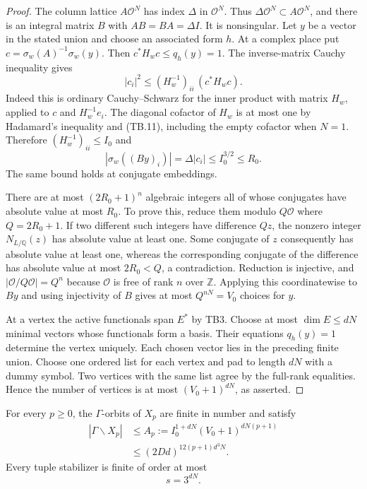 \begin{proof}
The column lattice $A\mathcal O^N$ has index $\Delta$ in
$\mathcal O^N$.  Thus $\Delta\mathcal O^N\subset A\mathcal O^N$,
and there is an integral matrix $B$ with
$AB=BA=\Delta I$.  It is nonsingular.  Let $y$ be a vector in
the stated union and choose an associated form $h$.
At a complex place put $c=\sigma_w(A)^{-1}\sigma_w(y)$.
Then $c^*H_wc\le q_h(y)=1$.  The inverse-matrix Cauchy inequality
gives
\[
        |c_i|^2\le (H_w^{-1})_{ii}\,(c^*H_wc).
        \tag{TB.14}
\]
Indeed this is ordinary Cauchy--Schwarz for the inner product with
matrix $H_w$, applied to $c$ and $H_w^{-1}e_i$.
The diagonal cofactor of $H_w$ is at most one by Hadamard's
inequality and (TB.11), including the empty cofactor when $N=1$.
Therefore $(H_w^{-1})_{ii}\le I_0$ and
\[
       |\sigma_w((By)_i)|=\Delta |c_i|
                \le I_0^{3/2}\le R_0.
                \tag{TB.15}
\]
The same bound holds at conjugate embeddings.

There are at most $(2R_0+1)^n$ algebraic integers all of whose
conjugates have absolute value at most $R_0$.  To prove this,
reduce them modulo $Q\mathcal O$ where $Q=2R_0+1$.  If two
different such integers have difference $Qz$, the nonzero
integer $N_{L/\mathbb Q}(z)$ has absolute value at least one.
Some conjugate of $z$ consequently has absolute value at least
one, whereas the corresponding conjugate of the difference has
absolute value at most $2R_0<Q$, a contradiction.  Reduction is
injective, and $|\mathcal O/Q\mathcal O|=Q^n$ because
$\mathcal O$ is free of rank $n$ over $\mathbb Z$.
Applying this coordinatewise to $By$ and using injectivity of $B$
gives at most $Q^{nN}=V_0$ choices for $y$.

At a vertex the active functionals span $E^*$ by TB3.  Choose
at most $\dim E\le dN$ minimal vectors whose functionals form
a basis.  Their equations $q_h(y)=1$ determine the vertex
uniquely.  Each chosen vector lies in the preceding finite union.
Choose one ordered list for each vertex and pad to length $dN$
with a dummy symbol.  Two vertices with the same list agree by
the full-rank equalities.  Hence the number of vertices is at
most $(V_0+1)^{dN}$, as asserted.
\end{proof}

\begin{proposition}
\label{prop:tb-orbits-stabilizers}
For every $p\ge0$, the $\Gamma$-orbits of $X_p$ are finite in
number and satisfy
\[
 \begin{split}
 |\Gamma\backslash X_p|
 &\le A_p:=I_0^{1+dN}(V_0+1)^{dN(p+1)}\\
 &\le (2Dd)^{12(p+1)d^3N}.
 \end{split}
 \tag{TB.16}
\]
Every tuple stabilizer is finite of order at most
\[
                         s=3^{dN}.
                         \tag{TB.17}
\]
\end{proposition}

